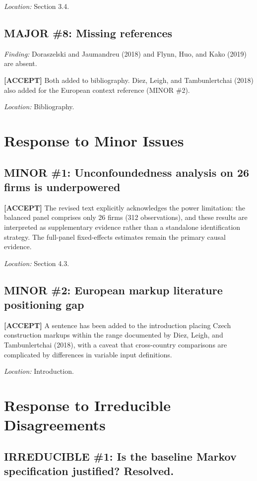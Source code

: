 \documentclass[11pt]{article}
\newcommand{\accept}{\textcolor{accept}{\textbf{[ACCEPT]}}}
\begin{document}
\textit{Location:} Section 3.4.

\subsection*{MAJOR \#8: Missing references}

\textit{Finding:} Doraszelski and Jaumandreu (2018) and Flynn, Huo, and Kako (2019) are absent.

\accept{} Both added to bibliography. Diez, Leigh, and Tambunlertchai (2018) also added for the European context reference (MINOR \#2).

\textit{Location:} Bibliography.

\section{Response to Minor Issues}

\subsection*{MINOR \#1: Unconfoundedness analysis on 26 firms is underpowered}

\accept{} The revised text explicitly acknowledges the power limitation: the balanced panel comprises only 26 firms (312 observations), and these results are interpreted as supplementary evidence rather than a standalone identification strategy. The full-panel fixed-effects estimates remain the primary causal evidence.

\textit{Location:} Section 4.3.

\subsection*{MINOR \#2: European markup literature positioning gap}

\accept{} A sentence has been added to the introduction placing Czech construction markups within the range documented by Diez, Leigh, and Tambunlertchai (2018), with a caveat that cross-country comparisons are complicated by differences in variable input definitions.

\textit{Location:} Introduction.

\section{Response to Irreducible Disagreements}

\subsection*{IRREDUCIBLE \#1: Is the baseline Markov specification justified? \textbf{Resolved.}}
\end{document}
